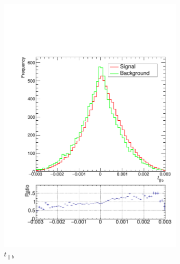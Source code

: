 \documentclass[10pt,a4paper]{book}
\begin{document}
\begin{figure}
\begin{subfigure}{.33\textwidth}
\includegraphics[scale=0.25]{reco/tpar2}
\caption{$t_{\parallel b}$}
\end{subfigure}
\begin{subfigure}{0.33\textwidth}
\centering

\end{subfigure}
\end{figure}
\end{document}
